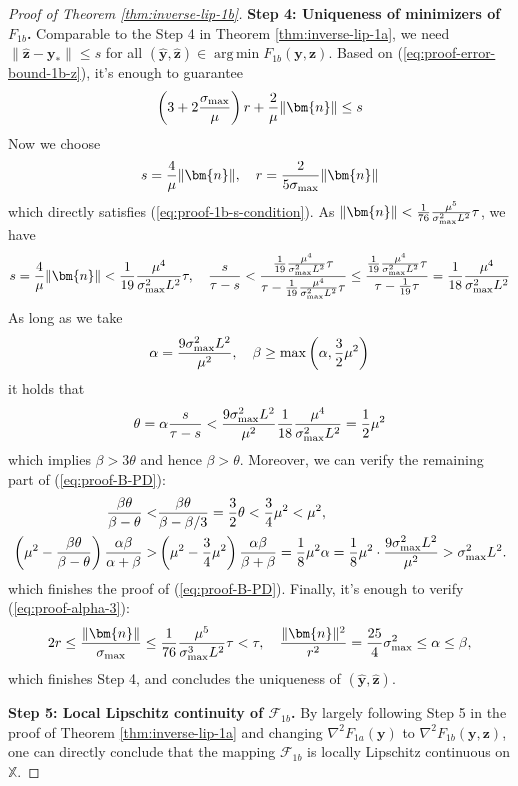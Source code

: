 \documentclass{amsart} %
\def\eqref#1{equation~\ref{#1}}
\def\vn{{\bm{n}}}
\def\vy{{\bm{y}}}
\def\vz{{\bm{z}}}
\def\sX{{\mathbb{X}}}
\DeclareMathOperator*{\argmin}{arg\,min}
\def\cF{{\mathcal{F}}}
\theoremstyle{definition}
\theoremstyle{remark}
\renewcommand{\eqref}[1]{\textup{(\ref{#1})}}
\begin{document}
\begin{proof}[Proof of Theorem \ref{thm:inverse-lip-1b}]
\textbf{Step 4: Uniqueness of minimizers of $F_{1b}$.} Comparable to the Step 4 in Theorem \ref{thm:inverse-lip-1a}, we need $\|\hat{\vz}-\vy_\ast\| \leq s$ for all $(\hat{\vy},\hat{\vz}) \in \argmin F_{1b}(\vy,\vz)$. Based on \eqref{eq:proof-error-bound-1b-z}, it's enough to guarantee
\begin{equation}
\label{eq:proof-1b-s-condition}
\left(3 + 2 \frac{\sigma_{\textup{max}}}{\mu} \right) r + \frac{2}{\mu} \|\vn\| \leq s
\end{equation}
Now we choose
\[ s = \frac{4}{\mu} \|\vn\|, \quad r = \frac{2}{5\sigma_{\textup{max}}} \|\vn\|\]
which directly satisfies \eqref{eq:proof-1b-s-condition}. As $\|\vn\| < \frac{1}{76}\frac{\mu^5}{\sigma^2_{\textup{max}}L^2} \tau$, we have
\[ s = \frac{4}{\mu} \|\vn\| < \frac{1}{19} \frac{\mu^4}{\sigma^2_{\textup{max}}L^2} \tau, \quad \frac{s}{\tau-s} < \frac{\frac{1}{19} \frac{\mu^4}{\sigma^2_{\textup{max}}L^2} \tau}{\tau - \frac{1}{19} \frac{\mu^4}{\sigma^2_{\textup{max}}L^2} \tau} \leq \frac{\frac{1}{19} \frac{\mu^4}{\sigma^2_{\textup{max}}L^2} \tau}{\tau - \frac{1}{19}  \tau} = \frac{1}{18} \frac{\mu^4}{\sigma^2_{\textup{max}}L^2}\]
As long as we take
\[\alpha = \frac{9\sigma^2_{\textup{max}}L^2}{\mu^2}, \quad \beta \geq \max\left(\alpha, \frac{3}{2} \mu^2\right)\]
it holds that
\[
\theta = \alpha \frac{s}{\tau-s} < \frac{9\sigma^2_{\textup{max}}L^2}{\mu^2} \frac{1}{18} \frac{\mu^4}{\sigma^2_{\textup{max}}L^2} = \frac{1}{2} \mu^2 
\]
which implies $\beta > 3 \theta$ and hence $\beta > \theta$. Moreover, we can verify the remaining part of \eqref{eq:proof-B-PD}:
\[
\begin{aligned}
\frac{\beta \theta}{\beta-\theta} <&  \frac{\beta \theta}{\beta - \beta/3} = \frac{3}{2}\theta < \frac{3}{4}\mu^2 < \mu^2, \\ 
\left(\mu^2 - \frac{\beta \theta}{\beta-\theta}\right)\frac{\alpha\beta}{\alpha+\beta} >&  \left(\mu^2 - \frac{3}{4}\mu^2\right) \frac{\alpha\beta}{\beta+\beta} = \frac{1}{8} \mu^2 \alpha = \frac{1}{8} \mu^2 \cdot \frac{9\sigma^2_{\textup{max}}L^2}{\mu^2} > \sigma^2_{\textup{max}}L^2.
\end{aligned}
\]
which finishes the proof of \eqref{eq:proof-B-PD}. Finally, it's enough to verify \eqref{eq:proof-alpha-3}:
  \[2r \leq \frac{\|\vn\|}{\sigma_{\textup{max}}} \leq \frac{1}{76}\frac{\mu^5}{\sigma^3_{\textup{max}}L^2} \tau < \tau, \quad \frac{\|\vn\|^2}{r^2} = \frac{25}{4} \sigma^2_{\textup{max}} \leq \alpha \leq \beta,\]
  which finishes Step 4, and concludes the uniqueness of $(\hat{\vy},\hat{\vz})$.
  

\textbf{Step 5: Local Lipschitz continuity of $\cF_{1b}$.} By largely following Step 5 in the proof of Theorem \ref{thm:inverse-lip-1a} and changing $\nabla^2 F_{1a}(\vy)$ to $\nabla^2 F_{1b}(\vy,\vz)$, one can directly conclude that the mapping $\cF_{1b}$ is locally Lipschitz continuous on $\sX$.
\end{proof}
\end{document}

